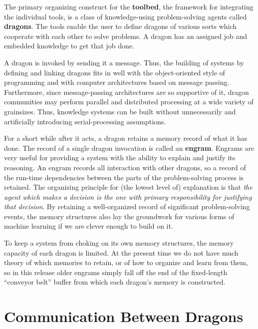 The primary organizing construct for the {\bf toolbed}, the framework
for integrating the individual tools, is a class of knowledge-using
problem-solving agents called {\bf dragons}.  The tools enable the
user to define dragons of various sorts which cooperate with each
other to solve problems.  A dragon has an assigned job and embedded
knowledge to get that job done.

A dragon is invoked by sending it a message.  Thus, the building of
systems by defining and linking dragons fits in well with the
object-oriented style of programming and with computer architectures
based on message passing.  Furthermore, since message-passing
architectures are so supportive of it, dragon communities may perform
parallel and distributed processing at a wide variety of grainsizes.
Thus, knowledge systems can be built without unnecessarily and
artificially introducing serial-processing assumptions.

For a short while after it acts, a dragon retains a memory record of
what it has done.  The record of a single dragon invocation is called
an {\bf engram}.  Engrams are very useful for providing a system with
the ability to explain and justify its reasoning.  An engram records
all interaction with other dragons, so a record of the run-time
dependencies between the parts of the problem-solving process is
retained.  The organizing principle for (the lowest level of)
explanation is that {\em the agent which makes a decision is the one
with primary responsibility for justifying that decision\/}.  By
retaining a well-organized record of significant problem-solving
events, the memory structures also lay the groundwork for various
forms of machine learning if we are clever enough to build on it.


To keep a system from choking on its own memory structures, the memory
capacity of each dragon is limited.  At the present time we do not
have much theory of which memories to retain, or of how to organize
and learn from them, so in this release older engrams simply fall off
the end of the fixed-length ``conveyor belt'' buffer from which each
dragon's memory is constructed.



\section{Communication Between Dragons\label{messages}}

